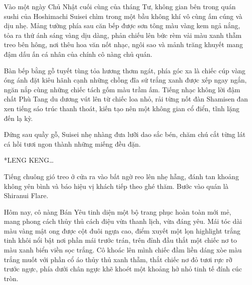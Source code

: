 \documentclass[../main.tex]{subfiles}
\begin{document}

Vào một ngày Chủ Nhật cuối cùng của tháng Tư, không gian bên trong quán sushi của Hoshimachi Suisei chìm trong một bầu không khí vô cùng ấm cúng và dịu nhẹ. Mảng tường phía sau căn bếp được sơn tông màu vàng kem ngả nắng, tỏa ra thứ ánh sáng vàng dịu dàng, phản chiếu lên bức rèm vải màu xanh thẫm treo bên hông, nơi thêu hoa văn nốt nhạc, ngôi sao và mảnh trăng khuyết mang đậm dấu ấn cá nhân của chính cô nàng chủ quán.


Bàn bếp bằng gỗ tuyết tùng tỏa hương thơm ngát, phía góc xa là chiếc cúp vàng óng ánh đặt kiêu hãnh cạnh những chồng đĩa sứ trắng xanh được xếp ngay ngắn, ngăn nắp cùng những chiếc tách gốm màu trầm ấm. Tiếng nhạc không lời đậm chất Phù Tang du dương vút lên từ chiếc loa nhỏ, rải từng nốt đàn Shamisen đan xen tiếng sáo trúc thanh thoát, kiến tạo nên một không gian cổ điển, tĩnh lặng đến lạ kỳ.


Đứng sau quầy gỗ, Suisei nhẹ nhàng đưa lưỡi dao sắc bén, chăm chú cắt từng lát cá hồi tươi ngon thành những miếng đều đặn.

*LENG KENG\dots*


Tiếng chuông gió treo ở cửa ra vào bất ngờ reo lên nhẹ hẫng, đánh tan khoảng không yên bình và báo hiệu vị khách tiếp theo ghé thăm. Bước vào quán là Shiranui Flare.

\chrint

Hôm nay, cô nàng Bán Yêu tinh diện một bộ trang phục hoàn toàn mới mẻ, mang phong cách thủy thủ cách điệu vừa thanh lịch, vừa đáng yêu. Mái tóc dài màu vàng mật ong được cột đuôi ngựa cao, điểm xuyết một lọn highlight trắng tinh khôi nổi bật nơi phần mái trước trán, trên đỉnh đầu thắt một chiếc nơ to màu xanh biển viền sọc trắng. Cô khoác lên mình chiếc đầm liền dáng xòe màu trắng muốt với phần cổ áo thủy thủ xanh thẫm, thắt chiếc nơ đỏ tươi rực rỡ trước ngực, phía dưới chân ngực khẽ khoét một khoảng hở nhỏ tinh tế đính cúc tròn. 
\end{document}

